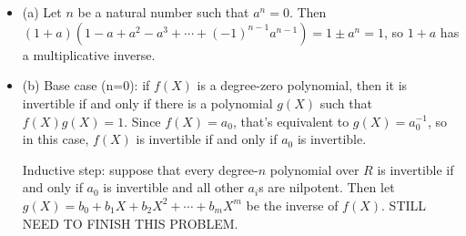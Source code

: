 \documentclass[12pt]{article}
\begin{document}
\section{}
\noindent{}\bigskip
\par
\begin{itemize}
    \item (a) Let $n$ be a natural number such that $a^n=0$. Then $(1+a)(1-a+a^2-a^3+\cdots + (-1)^{n-1} a^{n-1})=1 \pm a^n=1$, so $1+a$ has a multiplicative inverse.
    \item (b) Base case (n=0): if $f(X)$ is a degree-zero polynomial, then it is invertible if and only if there is a polynomial $g(X)$ such that $f(X)g(X)=1$. Since $f(X)=a_0$, that's equivalent to $g(X) = a_0^{-1}$, so in this case, $f(X)$ is invertible if and only if $a_0$ is invertible.
        \par
        Inductive step: suppose that every degree-$n$ polynomial over $R$ is invertible if and only if $a_0$ is invertible and all other $a_i$s are nilpotent. Then let $g(X)=b_0 + b_1X + b_2 X^2 + \cdots + b_mX^m$ be the inverse of $f(X)$. STILL NEED TO FINISH THIS PROBLEM.
\end{itemize}
\end{document}
